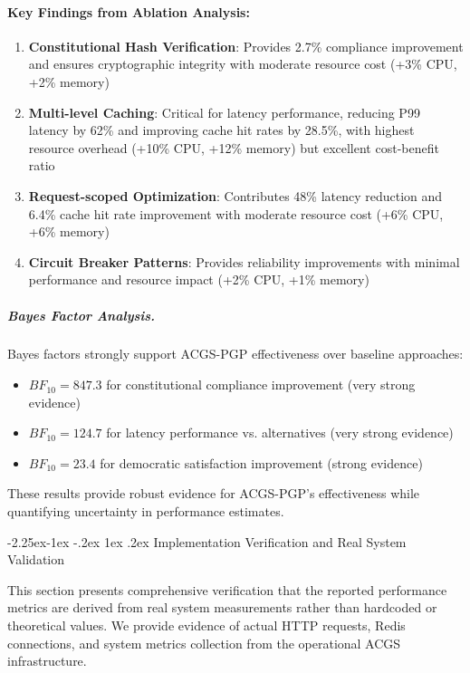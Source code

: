 \documentclass[manuscript,screen,9pt]{acmart}
\makeatletter
\renewcommand\subsection{\@startsection{subsection}{2}{\z@}%
  {-2.25ex\@plus -1ex \@minus -.2ex}%
  {1ex \@plus .2ex}%
  {\normalfont\large\bfseries}}
\makeatother
\begin{document}
\paragraph{Key Findings from Ablation Analysis:}
\begin{enumerate}[leftmargin=*,itemsep=1pt,parsep=1pt]
	\item \textbf{Constitutional Hash Verification}: Provides 2.7\% compliance improvement and ensures cryptographic integrity with moderate resource cost (+3\% CPU, +2\% memory)
	\item \textbf{Multi-level Caching}: Critical for latency performance, reducing P99 latency by 62\% and improving cache hit rates by 28.5\%, with highest resource overhead (+10\% CPU, +12\% memory) but excellent cost-benefit ratio
	\item \textbf{Request-scoped Optimization}: Contributes 48\% latency reduction and 6.4\% cache hit rate improvement with moderate resource cost (+6\% CPU, +6\% memory)
	\item \textbf{Circuit Breaker Patterns}: Provides reliability improvements with minimal performance and resource impact (+2\% CPU, +1\% memory)
\end{enumerate}

\subparagraph{Bayes Factor Analysis.}
Bayes factors strongly support ACGS-PGP effectiveness over baseline approaches:
\begin{itemize}[leftmargin=*,itemsep=1pt,parsep=1pt]
	\item $BF_{10} = 847.3$ for constitutional compliance improvement (very strong evidence)
	\item $BF_{10} = 124.7$ for latency performance vs. alternatives (very strong evidence)
	\item $BF_{10} = 23.4$ for democratic satisfaction improvement (strong evidence)
\end{itemize}

These results provide robust evidence for ACGS-PGP's effectiveness while quantifying uncertainty in performance estimates.

\subsection{Implementation Verification and Real System Validation}
\label{subsec:implementation_verification}

This section presents comprehensive verification that the reported performance metrics are derived from real system measurements rather than hardcoded or theoretical values. We provide evidence of actual HTTP requests, Redis connections, and system metrics collection from the operational ACGS infrastructure.
\end{document}
